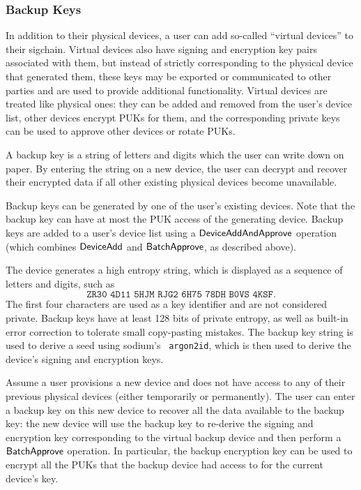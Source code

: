 \subsubsection{Backup Keys}
\label{subsubsec:backupkeys}

In addition to their physical devices, a user can add so-called ``virtual devices'' to their
sigchain. Virtual devices also have signing and encryption key pairs associated with them, but
instead of strictly corresponding to the physical device that generated them, these keys may be
exported or communicated to other parties and are used to provide additional functionality. Virtual
devices are treated like physical ones: they can be added and removed from the user's device list,
other devices encrypt PUKs for them, and the corresponding private keys can be used to approve other
devices or rotate PUKs.  

A backup key is a string of letters and digits which the user can write down on paper. By entering
the string on a new device, the user can decrypt and recover their encrypted data if all other
existing physical devices become unavailable.

Backup keys can be generated by one of the user's existing devices. Note that the backup key can
have at most the PUK access of the generating device. Backup keys are added to a user's device list
using a $\mathsf{DeviceAddAndApprove}{}$ operation (which combines $\mathsf{DeviceAdd}{}$ and $\mathsf{BatchApprove}{}$, as
described above).

The device generates a high entropy string, which is displayed as a sequence of letters and digits,
such as
%
\[ \texttt{ZR30 4D11 5HJM RJG2 6H75 78DH B0VS 4KSF}. \] 
%
The first four characters are used as a key identifier and are not considered private. Backup keys
have at least 128 bits of private entropy, as well as built-in error correction to tolerate small
copy-pasting mistakes. The backup key string is used to derive a seed using
sodium{}'s~\cite{libsodium} \texttt{argon2id}, which is then used to derive the device's signing and
encryption keys.

Assume a user provisions a new device and does not have access to any of their previous physical
devices (either temporarily or permanently). The user can enter a backup key on this new device to
recover all the data available to the backup key: the new device will use the backup key to
re-derive the signing and encryption key corresponding to the virtual backup device and then perform
a $\mathsf{BatchApprove}{}$ operation. In particular, the backup encryption key can be used to encrypt all
the PUKs that the backup device had access to for the current device's key.

